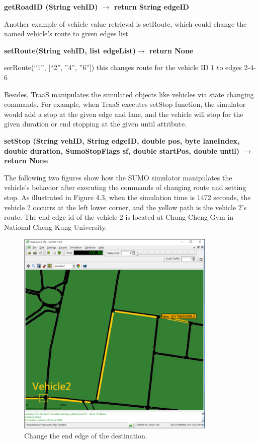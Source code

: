 \documentclass[12pt]{ksthesis}
\begin{document}
\begin{thesis}
{\textbf{getRoadID (String vehID) $\rightarrow$ return String edgeID}


Another example of vehicle value retrieval is setRoute, which could change the named vehicle’s route to given edges list.

\textbf{setRoute(String vehID, list edgeList)$\rightarrow$ return None}

serRoute(“1”, [“2”, ”4”, ”6”]) this changes route for the vehicle ID 1 to edges 2-4-6

Besides, TraaS manipulates the simulated objects like vehicles via state changing commands. For example, when TraaS executes setStop function, the simulator would add a stop at the given edge and lane, and the vehicle will stop for the given duration or end stopping at the given until attribute.
 
\textbf{setStop (String vehID, String edgeID, double pos, byte laneIndex, double duration, SumoStopFlags sf, double startPos, double until) $\rightarrow$ return None}
 
The following two figures show how the SUMO simulator manipulates the vehicle’s behavior after executing the commands of changing route and setting stop.
As illustrated in Figure 4.3, when the simulation time is 1472 seconds, the vehicle 2 occurrs at the left lower corner, and the yellow path is the vehicle 2’s route. 
The end edge id of the vehicle 2 is located at Chung Cheng Gym in National Cheng Kung University.

\begin{figure}[t!]
\centering
\includegraphics[width=0.85\textwidth]{./Thesis_figures/F4-3_Change_endEdge.PNG}
\caption{\large Change the end edge of the destination.}
\vspace{0.5cm}
\label{Fig:Change_endEdge}
\end{figure}

}
\end{thesis}
\end{document}
